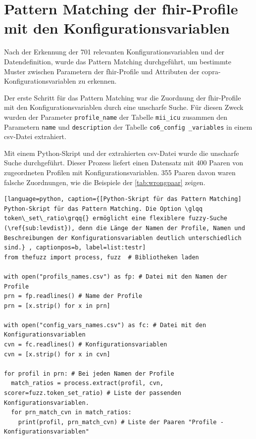 \section{Pattern Matching der \acs{fhir}-Profile mit den Konfigurationsvariablen} \label{sec:pattmach}

Nach der Erkennung der 701 relevanten Konfigurationsvariablen und der Datendefinition, wurde das Pattern Matching durchgeführt, um bestimmte Muster zwischen Parametern der \ac{fhir}-Profile und Attributen der \ac{copra}-Konfigurationsvariablen zu erkennen. 

Der erste Schritt für das Pattern Matching war die Zuordnung der \ac{fhir}-Profile mit den Konfigurationsvariablen durch eine unscharfe Suche. Für diesen Zweck wurden der Parameter \texttt{profile\_name} der Tabelle \texttt{mii\_icu} zusammen den Parametern \texttt{name} und \texttt{description} der Tabelle \texttt{co6\_config \_variables} in einem \ac{csv}-Datei extrahiert. 

Mit einem Python-Skript und der extrahierten \ac{csv}-Datei wurde die unscharfe Suche durchgeführt. Dieser Prozess liefert einen Datensatz mit 400 Paaren von zugeordneten Profilen mit Konfigurationsvariablen. 355 Paaren davon waren falsche Zuordnungen, wie die Beispiele der \ref{tab:wrongpaar} zeigen.

\begin{lstlisting}[language=python, caption={[Python-Skript für das Pattern Matching] Python-Skript für das Pattern Matching. Die Option \glqq token\_set\_ratio\grqq{} ermöglicht eine flexiblere fuzzy-Suche (\ref{sub:levdist}), denn die Länge der Namen der Profile, Namen und  Beschreibungen der Konfigurationsvariablen deutlich unterschiedlich sind.} , captionpos=b, label=list:testr]
from thefuzz import process, fuzz  # Bibliotheken laden

with open("profils_names.csv") as fp: # Datei mit den Namen der Profile
prn = fp.readlines() # Name der Profile
prn = [x.strip() for x in prn] 

with open("config_vars_names.csv") as fc: # Datei mit den Konfigurationsvariablen
cvn = fc.readlines() # Konfigurationsvariablen
cvn = [x.strip() for x in cvn]

for profil in prn: # Bei jeden Namen der Profile
  match_ratios = process.extract(profil, cvn, scorer=fuzz.token_set_ratio) # Liste der passenden Konfigurationsvariablen.
  for prn_match_cvn in match_ratios: 
    print(profil, prn_match_cvn) # Liste der Paaren "Profile - Konfigurationsvariablen"
   
\end{lstlisting}

